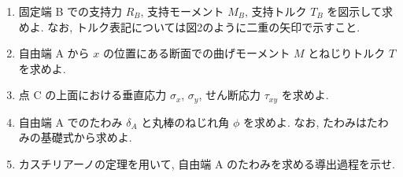 \begin{enumerate}[label=(\arabic*)]
  \item 固定端 B での支持力 $R_B$, 支持モーメント $M_B$, 支持トルク $T_B$ を図示して求めよ.
        なお, トルク表記については図2のように二重の矢印で示すこと.

  \item 自由端 A から $x$ の位置にある断面での曲げモーメント $M$ とねじりトルク $T$ を求めよ.

  \item 点 C の上面における垂直応力 $\sigma_x$, $\sigma_y$, せん断応力 $\tau_{xy}$ を求めよ.

  \item 自由端 A でのたわみ $\delta_A$ と丸棒のねじれ角 $\phi$ を求めよ.
        なお, たわみはたわみの基礎式から求めよ.

  \item カスチリアーノの定理を用いて, 自由端 A のたわみを求める導出過程を示せ.
\end{enumerate}
